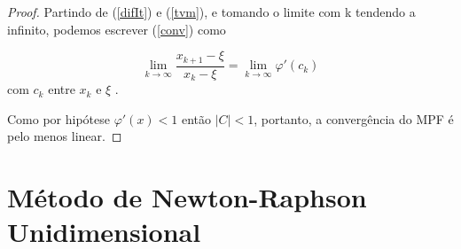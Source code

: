 \begin{proof}
Partindo de (\ref{difIt}) e (\ref{tvm}), e tomando o  limite com k tendendo a infinito, podemos escrever (\ref{conv}) como

\begin{equation*} %
    \lim_{k \to \infty} \frac{x_{k+1} - \xi}{x_k - \xi} = \lim_{k \to \infty}\varphi'(c_k)
\end{equation*} %
com $c_k$ entre $x_k$ e $\xi$
. %

Como por hipótese $\varphi'(x) < 1$ então $|C| < 1$, portanto, a convergência do MPF é pelo menos linear.
\end{proof}
\newpage
    
\section{Método de Newton-Raphson Unidimensional}\label{sec:NR1d}


